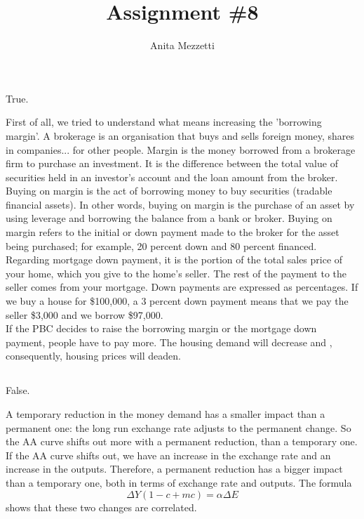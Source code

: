 \documentclass[	11pt, ]{fphw}
\title{Assignment \#8} %
\author{Anita Mezzetti}
\institute{École polytechnique fédérale de Lausanne}
\begin{document}
\maketitle


\section{}
\subsection{}
True. 
\par 
First of all, we tried to understand what means increasing the 'borrowing margin'. A brokerage is an organisation that buys and sells foreign money, shares in companies... for other people. Margin is the money borrowed from a brokerage firm to purchase an investment. It is the difference between the total value of securities held in an investor's account and the loan amount from the broker. Buying on margin is the act of borrowing money to buy securities (tradable financial assets). In other words, buying on margin is the purchase of an asset by using leverage and borrowing the balance from a bank or broker. Buying on margin refers to the initial or down payment made to the broker for the asset being purchased; for example, 20 percent down and 80 percent financed. \\
Regarding mortgage down payment, it is the portion of the total sales price of your home, which you give to the home’s seller. The rest of the payment to the seller comes from your mortgage. Down payments are expressed as percentages. If we buy a house for \$100,000, a 3 percent down payment means that we pay the seller \$3,000 and we borrow \$97,000. \\
If the PBC decides to raise the borrowing margin or the mortgage down payment, people have to pay more. The housing demand will decrease and , consequently, housing prices will deaden. 

\subsection{}
False. 
\par 
A temporary reduction in the money demand has a smaller impact than a permanent one: the long run exchange rate adjusts to the permanent change. So the AA curve shifts out more with a permanent reduction, than a temporary one. If the AA curve shifts out, we have an increase in the exchange rate and an increase in the outputs. Therefore, a permanent reduction has a bigger impact than a temporary one, both in terms of exchange rate and outputs. The formula
\[\Delta Y (1-c+mc)=\alpha \Delta E\]
shows that these two changes are correlated.
\end{document}
